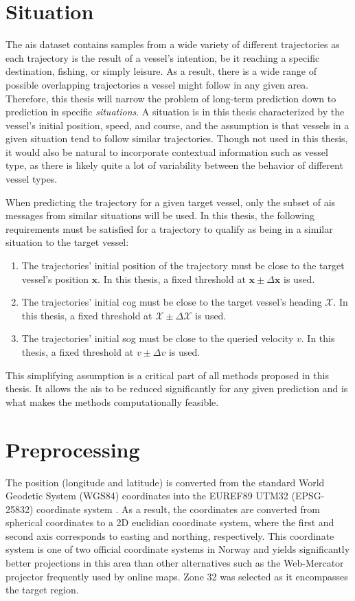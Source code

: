 \section{Situation}
The \acrshort{ais} dataset contains samples from a wide variety of different trajectories as each trajectory is the result of a vessel's intention, be it reaching a specific destination, fishing, or simply leisure. As a result, there is a wide range of possible overlapping trajectories a vessel might follow in any given area. Therefore, this thesis will narrow the problem of long-term prediction down to prediction in specific \textit{situations}. A situation is in this thesis characterized by the vessel's initial position, speed, and course, and the assumption is that vessels in a given situation tend to follow similar trajectories. Though not used in this thesis, it would also be natural to incorporate contextual information such as vessel type, as there is likely quite a lot of variability between the behavior of different vessel types. 

When predicting the trajectory for a given target vessel, only the subset of \acrshort{ais} messages from similar situations will be used. In this thesis, the following requirements must be satisfied for a trajectory to qualify as being in a similar situation to the target vessel:
\begin{enumerate}
    \item The trajectories' initial position of the trajectory must be close to the target vessel's position $\boldsymbol{x}$. In this thesis, a fixed threshold at $\boldsymbol{x} \pm \Delta \boldsymbol{x}$ is used.
    \item The trajectories' initial \acrshort{cog} must be close to the target vessel's heading $\mathcal{X}$. In this thesis, a fixed threshold at $\mathcal{X} \pm \Delta \mathcal{X}$ is used.
    \item The trajectories' initial \acrshort{sog} must be close to the queried velocity $v$. In this thesis, a fixed threshold at $v \pm \Delta v$ is used.
\end{enumerate}

This simplifying assumption is a critical part of all methods proposed in this thesis. It allows the \acrshort{ais} to be reduced significantly for any given prediction and is what makes the methods computationally feasible. 


\section{Preprocessing}
The position (longitude and latitude) is converted from the standard World Geodetic System (WGS84) coordinates into the EUREF89 UTM32 (EPSG-25832) coordinate system \cite{kartverket}.  As a result, the coordinates are converted from spherical coordinates to a 2D euclidian coordinate system, where the first and second axis corresponds to easting and northing, respectively. This coordinate system is one of two official coordinate systems in Norway and yields significantly better projections in this area than other alternatives such as the Web-Mercator projector frequently used by online maps. Zone 32 was selected as it encompasses the target region.

